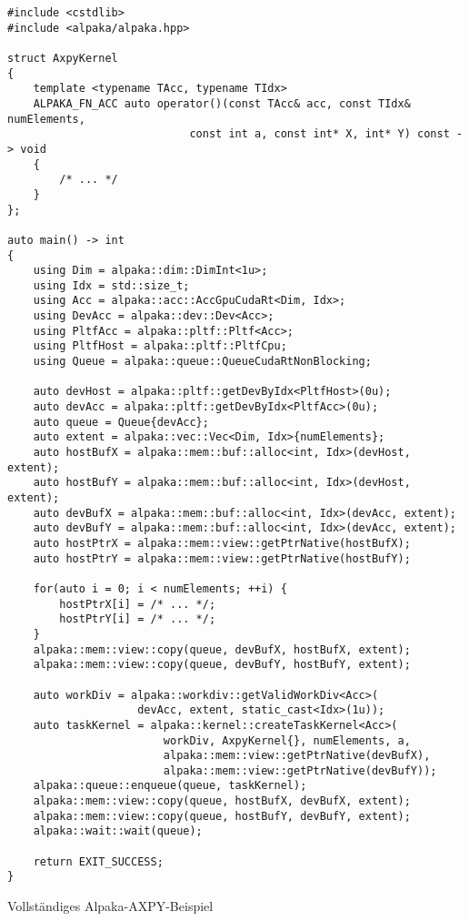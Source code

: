 \begin{code}
    \begin{verbatim}
#include <cstdlib>
#include <alpaka/alpaka.hpp>

struct AxpyKernel
{
    template <typename TAcc, typename TIdx>
    ALPAKA_FN_ACC auto operator()(const TAcc& acc, const TIdx& numElements,
                            const int a, const int* X, int* Y) const -> void
    {
        /* ... */
    }
};

auto main() -> int
{
    using Dim = alpaka::dim::DimInt<1u>;
    using Idx = std::size_t;
    using Acc = alpaka::acc::AccGpuCudaRt<Dim, Idx>;
    using DevAcc = alpaka::dev::Dev<Acc>;
    using PltfAcc = alpaka::pltf::Pltf<Acc>;
    using PltfHost = alpaka::pltf::PltfCpu;
    using Queue = alpaka::queue::QueueCudaRtNonBlocking;

    auto devHost = alpaka::pltf::getDevByIdx<PltfHost>(0u);
    auto devAcc = alpaka::pltf::getDevByIdx<PltfAcc>(0u);
    auto queue = Queue{devAcc};
    auto extent = alpaka::vec::Vec<Dim, Idx>{numElements};
    auto hostBufX = alpaka::mem::buf::alloc<int, Idx>(devHost, extent);
    auto hostBufY = alpaka::mem::buf::alloc<int, Idx>(devHost, extent);
    auto devBufX = alpaka::mem::buf::alloc<int, Idx>(devAcc, extent);
    auto devBufY = alpaka::mem::buf::alloc<int, Idx>(devAcc, extent);
    auto hostPtrX = alpaka::mem::view::getPtrNative(hostBufX);
    auto hostPtrY = alpaka::mem::view::getPtrNative(hostBufY);

    for(auto i = 0; i < numElements; ++i) {
        hostPtrX[i] = /* ... */;
        hostPtrY[i] = /* ... */;
    }
    alpaka::mem::view::copy(queue, devBufX, hostBufX, extent);
    alpaka::mem::view::copy(queue, devBufY, hostBufY, extent);

    auto workDiv = alpaka::workdiv::getValidWorkDiv<Acc>(
                    devAcc, extent, static_cast<Idx>(1u));
    auto taskKernel = alpaka::kernel::createTaskKernel<Acc>(
                        workDiv, AxpyKernel{}, numElements, a,
                        alpaka::mem::view::getPtrNative(devBufX),
                        alpaka::mem::view::getPtrNative(devBufY));
    alpaka::queue::enqueue(queue, taskKernel);
    alpaka::mem::view::copy(queue, hostBufX, devBufX, extent);
    alpaka::mem::view::copy(queue, hostBufY, devBufY, extent);
    alpaka::wait::wait(queue);

    return EXIT_SUCCESS;
}
    \end{verbatim}
    \caption{Vollständiges Alpaka-AXPY-Beispiel}
    \label{alpaka:ueberblick:axpy:zusammenfassung:src}
\end{code}


